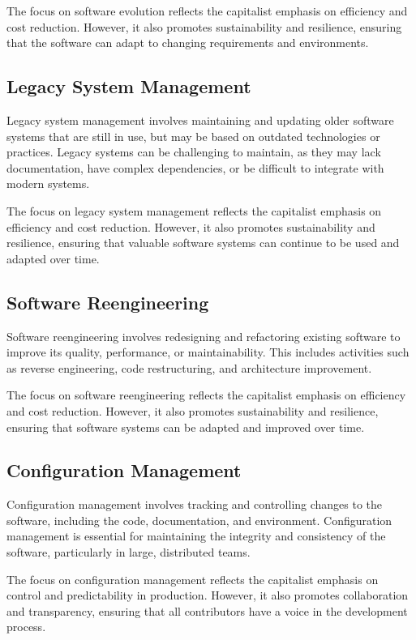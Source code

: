 \begin{refsection}
\begin{multicols}{2}
{The focus on software evolution reflects the capitalist emphasis on efficiency and cost reduction. However, it also promotes sustainability and resilience, ensuring that the software can adapt to changing requirements and environments.

\subsection{Legacy System Management}

Legacy system management involves maintaining and updating older software systems that are still in use, but may be based on outdated technologies or practices. Legacy systems can be challenging to maintain, as they may lack documentation, have complex dependencies, or be difficult to integrate with modern systems.

The focus on legacy system management reflects the capitalist emphasis on efficiency and cost reduction. However, it also promotes sustainability and resilience, ensuring that valuable software systems can continue to be used and adapted over time.

\subsection{Software Reengineering}

Software reengineering involves redesigning and refactoring existing software to improve its quality, performance, or maintainability. This includes activities such as reverse engineering, code restructuring, and architecture improvement.

The focus on software reengineering reflects the capitalist emphasis on efficiency and cost reduction. However, it also promotes sustainability and resilience, ensuring that software systems can be adapted and improved over time.

\subsection{Configuration Management}

Configuration management involves tracking and controlling changes to the software, including the code, documentation, and environment. Configuration management is essential for maintaining the integrity and consistency of the software, particularly in large, distributed teams.

The focus on configuration management reflects the capitalist emphasis on control and predictability in production. However, it also promotes collaboration and transparency, ensuring that all contributors have a voice in the development process.

}
\end{multicols}
\end{refsection}
